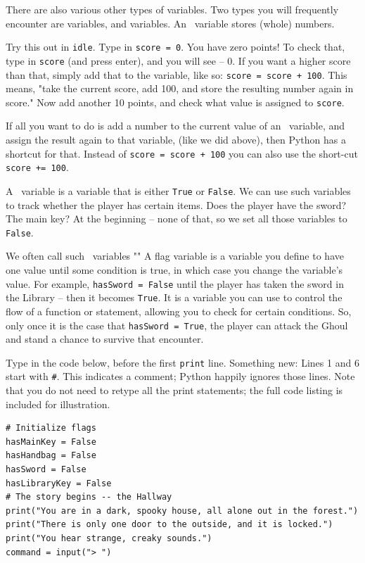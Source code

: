 There are also various other types of variables. Two types you will frequently encounter are \textit{\integer} variables, and \textit{\boolean} variables. An \integer\ variable stores (whole) numbers. 

 \begin{Exe} 
Try this out in \texttt{idle}. Type in \texttt{score = 0}. You have zero points! To check that, type in \texttt{score} (and press enter), and you will see -- 0. If you want a higher score than that, simply add that to the variable, like so: \texttt{score = score + 100}. This means, "take the current score, add 100, and store the resulting number again in score." Now add another 10 points, and check what value is assigned to \texttt{score}. \expend
\end{Exe}

\begin{Exp} 
If all you want to do is add a number to the current value of an \integer\ variable, and assign the result again to that variable, (like we did above), then Python has a shortcut for that. Instead of \texttt{score = score + 100} you can also use the short-cut \texttt{score += 100}. \expend
\end{Exp} 
 
A \boolean\ variable is a variable that is either \texttt{True} or \texttt{False}. We can use such variables to track whether the player has certain items. Does the player have the sword? The main key? At the beginning -- none of that, so we set all those variables to \texttt{False}. 

We often call such \boolean\ variables ""  A flag variable is a variable you define to have one value until some condition is true, in which case you change the variable's value. For example, \texttt{hasSword = False} until the player has taken the sword in the Library -- then it becomes \texttt{True}.  It is a variable you can use to control the flow of a function or statement, allowing you to check for certain conditions. So, only once it is the case that \texttt{hasSword = True}, the player can attack the Ghoul and stand a chance to survive that encounter. 

Type in the code below, before the first \texttt{print} line. Something new: Lines 1 and 6 start with \texttt{\#}. This indicates a comment; Python happily ignores those lines. Note that you do not need to retype all the print statements; the full code listing is included for illustration. 

\begin{lstlisting}
# Initialize flags 
hasMainKey = False 
hasHandbag = False
hasSword = False 
hasLibraryKey = False 
# The story begins -- the Hallway
print("You are in a dark, spooky house, all alone out in the forest.")
print("There is only one door to the outside, and it is locked.")
print("You hear strange, creaky sounds.")
command = input("> ")
\end{lstlisting}

